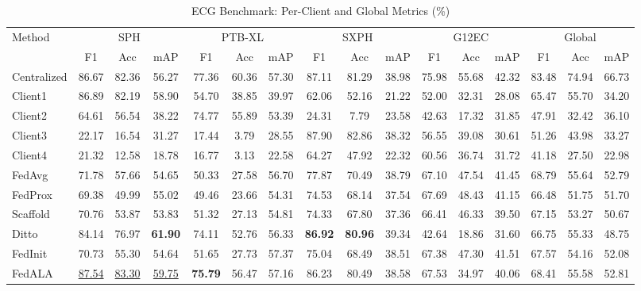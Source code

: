 \documentclass[a4paper]{article}
\begin{document}
\begin{table}[htbp]
  \centering
  \caption{ECG Benchmark: Per-Client and Global Metrics (\%)}
  \begin{adjustbox}{max width=\linewidth}
  \begin{tabular}{l|ccc|ccc|ccc|ccc|ccc}
    \toprule
    \multirow{2}{*}{Method} & \multicolumn{3}{c|}{SPH} & \multicolumn{3}{c|}{PTB-XL} & \multicolumn{3}{c|}{SXPH} & \multicolumn{3}{c|}{G12EC} & \multicolumn{3}{c}{Global} \\
    & F1 & Acc & mAP & F1 & Acc & mAP & F1 & Acc & mAP & F1 & Acc & mAP & F1 & Acc & mAP \\
    \midrule
    Centralized & 86.67 & 82.36 & 56.27 & 77.36 & 60.36 & 57.30 & 87.11 & 81.29 & 38.98 & 75.98 & 55.68 & 42.32 & 83.48 & 74.94 & 66.73 \\
    Client1 & 86.89 & 82.19 & 58.90 & 54.70 & 38.85 & 39.97 & 62.06 & 52.16 & 21.22 & 52.00 & 32.31 & 28.08 & 65.47 & 55.70 & 34.20 \\
    Client2 & 64.61 & 56.54 & 38.22 & 74.77 & 55.89 & 53.39 & 24.31 & 7.79 & 23.58 & 42.63 & 17.32 & 31.85 & 47.91 & 32.42 & 36.10 \\
    Client3 & 22.17 & 16.54 & 31.27 & 17.44 & 3.79 & 28.55 & 87.90 & 82.86 & 38.32 & 56.55 & 39.08 & 30.61 & 51.26 & 43.98 & 33.27 \\
    Client4 & 21.32 & 12.58 & 18.78 & 16.77 & 3.13 & 22.58 & 64.27 & 47.92 & 22.32 & 60.56 & 36.74 & 31.72 & 41.18 & 27.50 & 22.98 \\
    \midrule
    FedAvg & 71.78 & 57.66 & 54.65 & 50.33 & 27.58 & 56.70 & 77.87 & 70.49 & 38.79 & 67.10 & 47.54 & 41.45 & 68.79 & 55.64 & 52.79 \\
    FedProx & 69.38 & 49.99 & 55.02 & 49.46 & 23.66 & 54.31 & 74.53 & 68.14 & 37.54 & 67.69 & 48.43 & 41.15 & 66.48 & 51.75 & 51.70 \\
    Scaffold & 70.76 & 53.87 & 53.83 & 51.32 & 27.13 & 54.81 & 74.33 & 67.80 & 37.36 & 66.41 & 46.33 & 39.50 & 67.15 & 53.27 & 50.67 \\
    Ditto & 84.14 & 76.97 & \textbf{61.90} & 74.11 & 52.76 & 56.33 & \textbf{86.92} & \textbf{80.96} & 39.34 & 42.64 & 18.86 & 31.60 & 66.75 & 55.33 & 48.75 \\
    FedInit & 70.73 & 55.30 & 54.64 & 51.65 & 27.73 & 57.37 & 75.04 & 68.49 & 38.51 & 67.38 & 47.30 & 41.51 & 67.57 & 54.16 & 52.08 \\
    FedALA & \underline{87.54} & \underline{83.30} & \underline{59.75} & \textbf{75.79} & 56.47 & 57.16 & 86.23 & 80.49 & 38.58 & 67.53 & 34.97 & 40.06 & 68.41 & 55.58 & 52.81 \\

\end{tabular}
\end{adjustbox}
\end{table}
\end{document}
